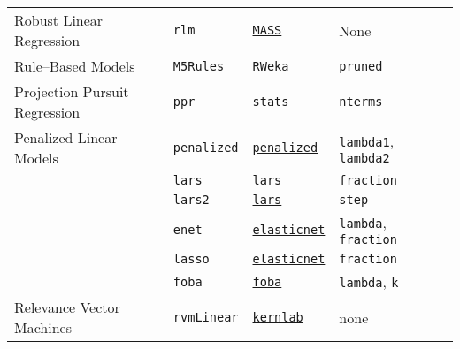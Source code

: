 \documentclass[12pt]{article}
\begin{document}
\begin{landscape}
\begin{longtable}{lllll}
\rowcolor[rgb]{.95, .95, .95}                    
      Robust Linear Regression &
         \texttt{rlm} & 
             {\tt \href{http://cran.r-project.org/web/packages/MASS/index.html}{MASS}}       & 
            None \\              
                   
      Rule--Based Models &
         \texttt{M5Rules} & 
            {\tt \href{http://cran.r-project.org/web/packages/RWeka/index.html}{RWeka}}    & 
            \texttt{pruned}  \\             

\rowcolor[rgb]{.95, .95, .95}         
      Projection Pursuit Regression  &
         \texttt{ppr} & 
            \texttt{stats}       & 
            \texttt{nterms} \\            
            
      Penalized Linear Models  &
         \texttt{penalized} & 
             {\tt \href{http://cran.r-project.org/web/packages/penalized/index.html}{penalized}}      & 
            \texttt{lambda1}, \texttt{lambda2} \\            
       
       &
         \texttt{lars} & 
             {\tt \href{http://cran.r-project.org/web/packages/lars/index.html}{lars}}      & 
            \texttt{fraction} \\   
         &
         \texttt{lars2} & 
             {\tt \href{http://cran.r-project.org/web/packages/lars/index.html}{lars}}        & 
            \texttt{step} \\            
                
      &
         \texttt{enet} & 
             {\tt \href{http://cran.r-project.org/web/packages/elasticnet/index.html}{elasticnet}}      & 
            \texttt{lambda}, \texttt{fraction} \\          

      &
         \texttt{lasso} & 
             {\tt \href{http://cran.r-project.org/web/packages/elasticnet/index.html}{elasticnet}}      & 
            \texttt{fraction} \\       
      
       &
         \texttt{foba} & 
             {\tt \href{http://cran.r-project.org/web/packages/foba/index.html}{foba}}       & 
            \texttt{lambda}, \texttt{k} \\    
            
\rowcolor[rgb]{.95, .95, .95}                     
      Relevance Vector Machines  &
         \texttt{rvmLinear} & 
             {\tt \href{http://cran.r-project.org/web/packages/kernlab/index.html}{kernlab}}        & 
            none \\            


\end{longtable}
\end{landscape}
\end{document}
